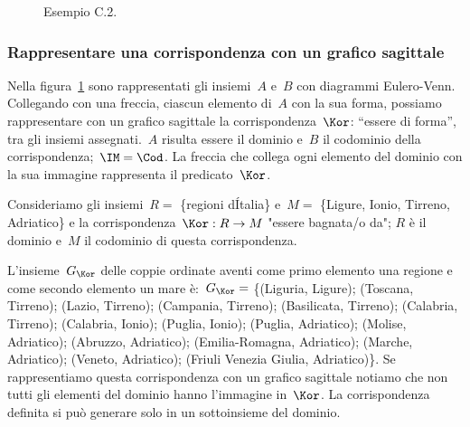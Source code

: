 \begin{inaccessibleblock}
 \begin{figure}[b]
\begin{minipage}[t]{.3\textwidth}
 \centering
 
 \caption{Esempio C.1.}\label{fig:C.1}
\end{minipage}\hfil
\begin{minipage}[t]{.65\textwidth}
 \centering
 
 \caption{Esempio C.2.}\label{fig:C.2}
\end{minipage}
\end{figure}
\end{inaccessibleblock}

\subsubsection{Rappresentare una corrispondenza con un grafico sagittale}

\begin{exrig}
 \begin{esempio}
 Nella figura~\ref{fig:C.2} sono rappresentati gli insiemi~$A$ e~$B$ con 
diagrammi Eulero-Venn.
 Collegando con una freccia, ciascun elemento di~$A$ con la sua forma, possiamo 
rappresentare
 con un grafico sagittale la corrispondenza~$\Kor$: ``essere di forma'', tra gli 
insiemi
 assegnati.~$A$ risulta essere il dominio e~$B$ il codominio della 
corrispondenza;~$\IM=\Cod$.
 La freccia che collega ogni elemento del dominio con la sua immagine 
rappresenta il predicato~$\Kor$.
\end{esempio}
\end{exrig}


\begin{exrig}
\begin{esempio}
Consideriamo gli insiemi~$R=$ \{regioni d\'Italia\} e~$M=$ \{Ligure, Ionio, 
Tirreno, Adriatico\} e la corrispondenza~$\Kor:R \rightarrow M$ "essere 
bagnata/o da"; $R$ è il dominio e~$M$
il codominio di questa corrispondenza.

L'insieme~$G_\Kor$ delle coppie ordinate aventi come primo elemento una regione 
e come secondo elemento un mare
è:~$G_\Kor=$ \{(Liguria, Ligure); (Toscana, Tirreno); (Lazio, Tirreno); 
(Campania, Tirreno); (Basilicata, Tirreno); (Calabria, Tirreno); (Calabria, 
Ionio); (Puglia, Ionio);
(Puglia, Adriatico); (Molise, Adriatico); (Abruzzo, Adriatico); (Emilia-Romagna, 
Adriatico); (Marche, Adriatico); (Veneto, Adriatico); (Friuli Venezia Giulia, 
Adriatico)\}.
Se rappresentiamo questa corrispondenza con un grafico sagittale notiamo che non 
tutti gli elementi del dominio hanno l'immagine in~$\Kor$. La corrispondenza 
definita
si può generare solo in un sottoinsieme del dominio.
\end{esempio}
\end{exrig}

